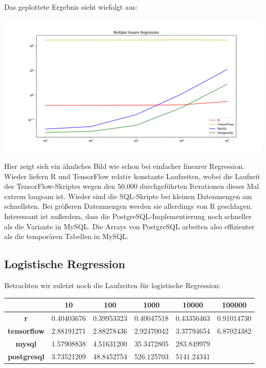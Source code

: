 Das geplottete Ergebnis sieht wiefolgt aus:

\includegraphics[width=\textwidth]{multipleLinearRegressionBenchmark}

Hier zeigt sich ein ähnliches Bild wie schon bei einfacher linearer Regression. Wieder liefern R und TensorFlow relativ konstante Laufzeiten, wobei die Laufzeit des TensorFlow-Skriptes wegen den $50.000$ durchgeführten Iterationen dieses Mal extrem langsam ist. Wieder sind die SQL-Skripte bei kleinen Datenmengen am schnellsten. Bei größeren Datenmengen werden sie allerdings von R geschlagen. Interessant ist außerdem, dass die PostgreSQL-Implementierung noch schneller als die Variante in MySQL. Die Arrays von PostgreSQL arbeiten also effizienter als die temporären Tabellen in MySQL.

\subsection{Logistische Regression}
\label{subsection:4:1:3}

Betrachten wir zuletzt noch die Laufzeiten für logistische Regression:

\begin{center}
  \begin{tabular}{|c|c|c|c|c|c|}\hline
    & \textbf{10} & \textbf{100} & \textbf{1000} & \textbf{10000} & \textbf{100000} \\ \hline
    \textbf{r} & 0.40403676 & 0.39953323 & 0.40047518 & 0.43356463 & 0.91014730 \\ \hline
    \textbf{tensorflow} & 2.88191271 & 2.88278436 & 2.92470042 & 3.37794654 & 6.87024382 \\ \hline
    \textbf{mysql} & 1.57908838 & 4.51631200 & 35.3472805 & 283.849979 & \\ \hline
    \textbf{postgresql} & 3.73521209 & 48.8452754 & 526.125703 &5141.24341 & \\ \hline
  \end{tabular}
\end{center}

